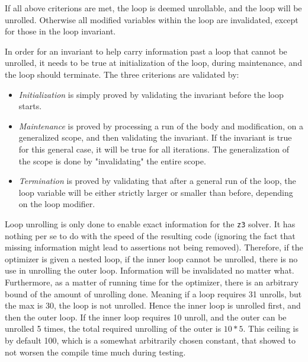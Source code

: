 \noindent
If all above criterions are met, the loop is deemed unrollable, and the loop will be unrolled.
Otherwise all modified variables within the loop are invalidated, except for those in
the loop invariant.

In order for an invariant to help carry information past a loop that cannot be unrolled, it needs
to be true at initialization of the loop, during maintenance, and the loop should terminate.
The three criterions are validated by:
\begin{itemize}
    \item \emph{Initialization} is simply proved by validating the invariant before the loop starts.

    \item \emph{Maintenance} is proved by processing a run of the body and modification, on a
          generalized scope, and then validating the invariant. If the invariant is true for this
          general case, it will be true for all iterations. The generalization of the scope is
          done by "invalidating" the entire scope.

    \item \emph{Termination} is proved by validating that after a general run of the loop,
          the loop variable will be either strictly larger or smaller than before, depending
          on the loop modifier.
\end{itemize}
\noindent
Loop unrolling is only done to enable exact information for the \texttt{z3} solver. It has nothing
per se to do with the speed of the resulting code (ignoring the fact that missing information
might lead to assertions not being removed). Therefore, if the optimizer is given a nested loop,
if the inner loop cannot be unrolled, there is no use in unrolling the outer loop. Information will
be invalidated no matter what. Furthermore, as a matter of running time for the optimizer, there
is an arbitrary bound of the amount of unrolling done. Meaning if a loop requires 31 unrolls, but
the max is 30, the loop is not unrolled. Hence the inner loop is unrolled first, and then the outer
loop. If the inner loop requires 10 unroll, and the outer can be unrolled 5 times, the total
required unrolling of the outer is $10*5$. This ceiling is by default 100, which is a somewhat
arbitrarily chosen constant, that showed to not worsen the compile time much during testing.


